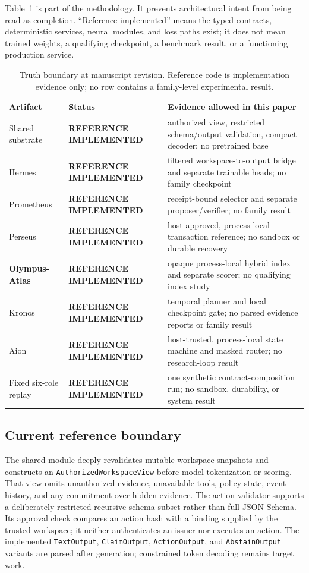 \documentclass[10pt]{article}
\newcommand{\atlas}{\textbf{Olympus-Atlas}}
\newcommand{\implemented}{\textcolor{blue!60!black}{\textbf{REFERENCE IMPLEMENTED}}}
\begin{document}
Table~\ref{tab:status} is part of the methodology. It prevents architectural
intent from being read as completion. ``Reference implemented'' means the
typed contracts, deterministic services, neural modules, and loss paths exist;
it does not mean trained weights, a qualifying checkpoint, a benchmark result,
or a functioning production service.

\begin{table}[h]
\centering
\small
\begin{tabularx}{\linewidth}{l l >{\raggedright\arraybackslash}X}
\toprule
Artifact & Status & Evidence allowed in this paper \\
\midrule
Shared substrate & \implemented & authorized view, restricted schema/output validation, compact decoder; no pretrained base \\
Hermes & \implemented & filtered workspace-to-output bridge and separate trainable heads; no family checkpoint \\
Prometheus & \implemented & receipt-bound selector and separate proposer/verifier; no family result \\
Perseus & \implemented & host-approved, process-local transaction reference; no sandbox or durable recovery \\
\atlas & \implemented & opaque process-local hybrid index and separate scorer; no qualifying index study \\
Kronos & \implemented & temporal planner and local checkpoint gate; no parsed evidence reports or family result \\
Aion & \implemented & host-trusted, process-local state machine and masked router; no research-loop result \\
Fixed six-role replay & \implemented & one synthetic contract-composition run; no sandbox, durability, or system result \\
\bottomrule
\end{tabularx}
\caption{Truth boundary at manuscript revision. Reference code is implementation
evidence only; no row contains a family-level experimental result.}
\label{tab:status}
\end{table}

\subsection{Current reference boundary}

The shared module deeply revalidates mutable workspace snapshots and constructs
an \texttt{AuthorizedWorkspaceView} before model tokenization or scoring. That
view omits unauthorized evidence, unavailable tools, policy state, event
history, and any commitment over hidden evidence. The action validator supports
a deliberately restricted recursive schema subset rather than full JSON Schema.
Its approval check compares an action hash with a binding supplied by the
trusted workspace; it neither authenticates an issuer nor executes an action.
The implemented \texttt{TextOutput}, \texttt{ClaimOutput},
\texttt{ActionOutput}, and \texttt{AbstainOutput} variants are parsed after
generation; constrained token decoding remains target work.
\end{document}
